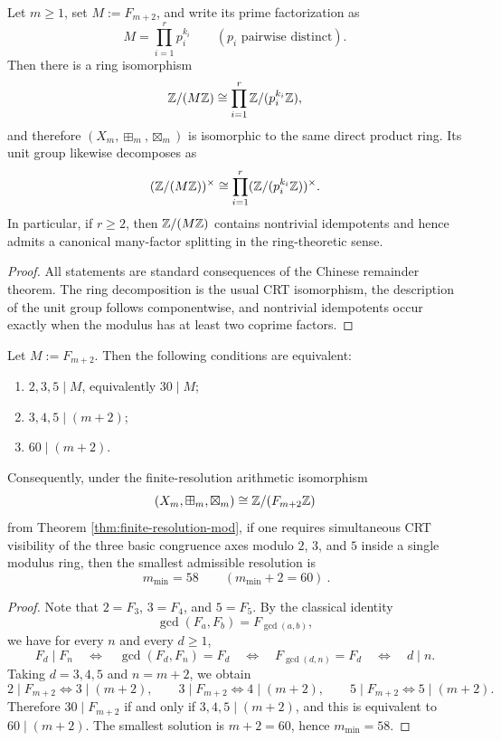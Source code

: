 \begin{corollary}\label{cor:crt-factorization}
Let \(m\ge 1\), set \(M:=F_{m+2}\), and write its prime factorization as
\[
M=\prod_{i=1}^{r} p_i^{k_i}
\qquad
(p_i\text{ pairwise distinct}).
\]
Then there is a ring isomorphism
\[
\mathbb{Z}/(M\mathbb{Z})\cong \prod_{i=1}^{r}\mathbb{Z}/(p_i^{k_i}\mathbb{Z}),
\]
and therefore \((X_m,\boxplus_m,\boxtimes_m)\) is isomorphic to the same direct product ring. Its unit group likewise decomposes as
\[
(\mathbb{Z}/(M\mathbb{Z}))^\times\cong \prod_{i=1}^{r}(\mathbb{Z}/(p_i^{k_i}\mathbb{Z}))^\times.
\]
In particular, if \(r\ge 2\), then \(\mathbb{Z}/(M\mathbb{Z})\) contains nontrivial idempotents and hence admits a canonical many-factor splitting in the ring-theoretic sense.
\end{corollary}

\begin{proof}
All statements are standard consequences of the Chinese remainder theorem. The ring decomposition is the usual CRT isomorphism, the description of the unit group follows componentwise, and nontrivial idempotents occur exactly when the modulus has at least two coprime factors.
\end{proof}

\begin{proposition}\label{prop:crt-235-min-depth}
Let \(M:=F_{m+2}\). Then the following conditions are equivalent:
\begin{enumerate}
  \item \(2,3,5\mid M\), equivalently \(30\mid M\);
  \item \(3,4,5\mid (m+2)\);
  \item \(60\mid (m+2)\).
\end{enumerate}
Consequently, under the finite-resolution arithmetic isomorphism
\[
(X_m,\boxplus_m,\boxtimes_m)\cong \mathbb{Z}/(F_{m+2}\mathbb{Z})
\]
from Theorem \ref{thm:finite-resolution-mod}, if one requires simultaneous CRT visibility of the three basic congruence axes modulo \(2\), \(3\), and \(5\) inside a single modulus ring, then the smallest admissible resolution is
\[
\boxed{\ m_{\min}=58\qquad(m_{\min}+2=60)\ }.
\]
\end{proposition}

\begin{proof}
Note that \(2=F_3\), \(3=F_4\), and \(5=F_5\). By the classical identity
\[
\gcd(F_a,F_b)=F_{\gcd(a,b)},
\]
we have for every \(n\) and every \(d\ge 1\),
\[
F_d\mid F_n
\quad\Longleftrightarrow\quad
\gcd(F_d,F_n)=F_d
\quad\Longleftrightarrow\quad
F_{\gcd(d,n)}=F_d
\quad\Longleftrightarrow\quad
d\mid n.
\]
Taking \(d=3,4,5\) and \(n=m+2\), we obtain
\[
2\mid F_{m+2}\Longleftrightarrow 3\mid(m+2),\qquad
3\mid F_{m+2}\Longleftrightarrow 4\mid(m+2),\qquad
5\mid F_{m+2}\Longleftrightarrow 5\mid(m+2).
\]
Therefore \(30\mid F_{m+2}\) if and only if \(3,4,5\mid(m+2)\), and this is equivalent to \(60\mid(m+2)\). The smallest solution is \(m+2=60\), hence \(m_{\min}=58\).
\end{proof}

